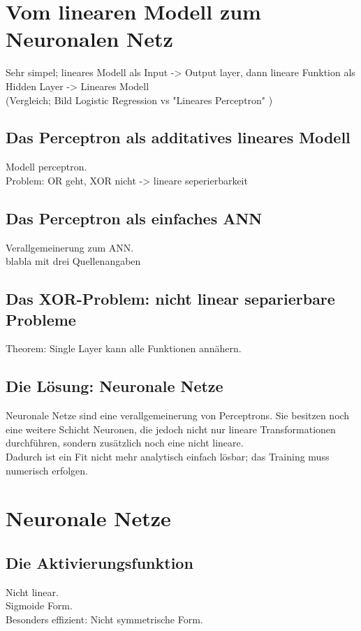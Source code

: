 
\section{Vom linearen Modell zum Neuronalen Netz}

Sehr simpel; lineares Modell als Input -> Output layer,
dann lineare Funktion als Hidden Layer -> Lineares Modell \\
(Vergleich; Bild Logistic Regression vs "Lineares Perceptron" )

\subsection{Das Perceptron als additatives lineares Modell}

Modell perceptron. \\Problem: OR geht, XOR nicht -> lineare seperierbarkeit

\subsection{Das Perceptron als einfaches ANN}

Verallgemeinerung zum ANN. \\
blabla mit drei Quellenangaben\cite{ietf-ipfix-protocol,snoeren2001hash,belenky2003ip}

\subsection{Das XOR-Problem: nicht linear separierbare Probleme}
Theorem: Single Layer kann alle Funktionen annähern.

\subsection{Die Lösung: Neuronale Netze}
Neuronale Netze sind eine verallgemeinerung von Perceptrons. Sie besitzen noch eine weitere Schicht Neuronen, die jedoch nicht nur lineare Transformationen durchführen, sondern zusätzlich noch eine nicht lineare. \\

Dadurch ist ein Fit nicht mehr analytisch einfach lösbar; das Training muss numerisch erfolgen.

\section{Neuronale Netze} %

\subsection{Die Aktivierungsfunktion}
Nicht linear. \\
Sigmoide Form. \\
Besonders effizient: Nicht symmetrische Form. \\


